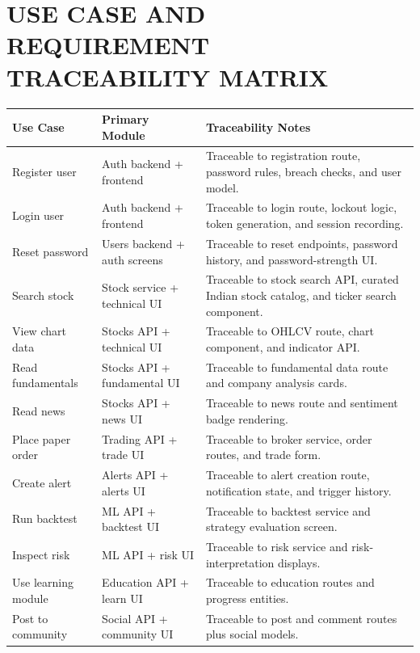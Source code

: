 \documentclass[12pt,a4paper]{report}
\begin{document}
\chapter{USE CASE AND REQUIREMENT TRACEABILITY MATRIX}
\begin{longtable}{p{} p{} p{}}
\textbf{Use Case} & \textbf{Primary Module} & \textbf{Traceability Notes} \\
\hline
Register user & Auth backend + frontend & Traceable to registration route, password rules, breach checks, and user model. \\
Login user & Auth backend + frontend & Traceable to login route, lockout logic, token generation, and session recording. \\
Reset password & Users backend + auth screens & Traceable to reset endpoints, password history, and password-strength UI. \\
Search stock & Stock service + technical UI & Traceable to stock search API, curated Indian stock catalog, and ticker search component. \\
View chart data & Stocks API + technical UI & Traceable to OHLCV route, chart component, and indicator API. \\
Read fundamentals & Stocks API + fundamental UI & Traceable to fundamental data route and company analysis cards. \\
Read news & Stocks API + news UI & Traceable to news route and sentiment badge rendering. \\
Place paper order & Trading API + trade UI & Traceable to broker service, order routes, and trade form. \\
Create alert & Alerts API + alerts UI & Traceable to alert creation route, notification state, and trigger history. \\
Run backtest & ML API + backtest UI & Traceable to backtest service and strategy evaluation screen. \\
Inspect risk & ML API + risk UI & Traceable to risk service and risk-interpretation displays. \\
Use learning module & Education API + learn UI & Traceable to education routes and progress entities. \\
Post to community & Social API + community UI & Traceable to post and comment routes plus social models. \\
\end{longtable}
\end{document}
